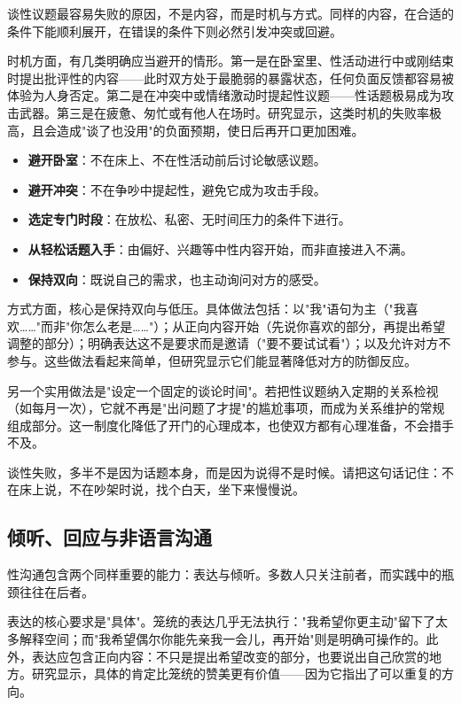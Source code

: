 \documentclass[12pt,UTF8]{ctexbook}
\newcommand{\keyword}[1]{\textbf{#1}}
\begin{document}
谈性议题最容易失败的原因，不是内容，而是时机与方式。同样的内容，在合适的条件下能顺利展开，在错误的条件下则必然引发冲突或回避。

时机方面，有几类明确应当避开的情形。第一是在卧室里、性活动进行中或刚结束时提出批评性的内容——此时双方处于最脆弱的暴露状态，任何负面反馈都容易被体验为人身否定。第二是在冲突中或情绪激动时提起性议题——性话题极易成为攻击武器。第三是在疲惫、匆忙或有他人在场时。研究显示，这类时机的失败率极高，且会造成"谈了也没用"的负面预期，使日后再开口更加困难。

\begin{itemize}
  \item \keyword{避开卧室}：不在床上、不在性活动前后讨论敏感议题。
  \item \keyword{避开冲突}：不在争吵中提起性，避免它成为攻击手段。
  \item \keyword{选定专门时段}：在放松、私密、无时间压力的条件下进行。
  \item \keyword{从轻松话题入手}：由偏好、兴趣等中性内容开始，而非直接进入不满。
  \item \keyword{保持双向}：既说自己的需求，也主动询问对方的感受。
\end{itemize}

方式方面，核心是保持双向与低压。具体做法包括：以"我"语句为主（"我喜欢……"而非"你怎么老是……"）；从正向内容开始（先说你喜欢的部分，再提出希望调整的部分）；明确表达这不是要求而是邀请（"要不要试试看"）；以及允许对方不参与。这些做法看起来简单，但研究显示它们能显著降低对方的防御反应。

另一个实用做法是"设定一个固定的谈论时间"。若把性议题纳入定期的关系检视（如每月一次），它就不再是"出问题了才提"的尴尬事项，而成为关系维护的常规组成部分。这一制度化降低了开门的心理成本，也使双方都有心理准备，不会措手不及。

\begin{tcolorbox}[colback=pink!5!white,colframe=red!50!black,title=贴心小叮咛]
谈性失败，多半不是因为话题本身，而是因为说得不是时候。请把这句话记住：不在床上说，不在吵架时说，找个白天，坐下来慢慢说。
\end{tcolorbox}

\subsection{倾听、回应与非语言沟通}

性沟通包含两个同样重要的能力：表达与倾听。多数人只关注前者，而实践中的瓶颈往往在后者。

表达的核心要求是"具体"。笼统的表达几乎无法执行："我希望你更主动"留下了太多解释空间；而"我希望偶尔你能先亲我一会儿，再开始"则是明确可操作的。此外，表达应包含正向内容：不只是提出希望改变的部分，也要说出自己欣赏的地方。研究显示，具体的肯定比笼统的赞美更有价值——因为它指出了可以重复的方向。
\end{document}
